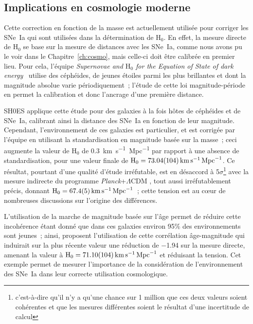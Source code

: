 \documentclass[../main/main.tex]{subfiles}
\begin{document}
\subsection{Implications en cosmologie moderne}\label{ssec:mcosmo}

Cette correction en fonction de la masse est actuellement utilisée pour corriger
les SNe~Ia qui sont utilisées dans la détermination de H$_0$. En effet, la
mesure directe de H$_0$ se base sur la mesure de distances avec les SNe~Ia,
comme nous avons pu le voir dans le Chapitre~\ref{ch:cosmo}, mais celle-ci doit
être calibrée en premier lieu. Pour cela, l'équipe \textit{Supernovae and
$\mathrm{H}_0$ for the Equation of State of dark energy}~\citep[SH0ES,
Supernovae et H$_0$ pour l'équation d'état de l'énergie sombre][]{riess2021}
utilise des céphéides, de jeunes étoiles parmi les plus brillantes et dont la
magnitude absolue varie périodiquement~; l'étude de cette loi magnitude-période
en permet la calibration et donc l'ancrage d'une première distance.

SH0ES applique cette étude pour des galaxies à la fois hôtes de céphéides et de
SNe~Ia, calibrant ainsi la distance des SNe~Ia en fonction de leur magnitude.
Cependant, l'environnement de ces galaxies est particulier, et est corrigée par
l'équipe en utilisant la standardisation en magnitude basée sur la masse~; ceci
augmente la valeur de H$_0$ de \SI{0.3}{km.s^{-1}.Mpc^{-1}} par rapport à une
absence de standardisation, pour une valeur finale de $\mathrm{H}_0 =
\SI{73.04\pm1.04}{km.s^{-1}.Mpc^{-1}}$. Ce résultat, pourtant d'une qualité
d'étude irréfutable, est en désaccord à 5$\sigma$\footnote{c'est-à-dire qu'il
    n'y a qu'une chance sur 1 million que ces deux valeurs soient cohérentes et
que les mesures différentes soient le résultat d'une incertitude de calcul}
avec la mesure indirecte du programme \textit{Planck}+$\Lambda$CDM
\citep{planck2018}, tout aussi irréfutablement précis, donnant $\mathrm{H}_0 =
\SI{67.4\pm0.5}{km.s^{-1}.Mpc^{-1}}$~; cette tension est au cœur de
nombreuses discussions sur l'origine des différences.

L'utilisation de la marche de magnitude basée sur l'âge permet de réduire cette
incohérence étant donné que dans ces galaxies environ 95\% des environnements
sont jeunes~; ainsi, \cite{rigault2015} proposent l'utilisation de cette
corrélation âge-magnitude qui induirait sur la plus récente valeur une réduction
de \num{-1.94} sur la mesure directe, amenant la valeur à $\mathrm{H}_0 =
\SI{71.10\pm1.04}{km.s^{-1}.Mpc^{-1}}$ et réduisant la tension. Cet exemple
permet de mesurer l'importance de la considération de l'environnement des SNe~Ia
dans leur correcte utilisation cosmologique.
\end{document}

